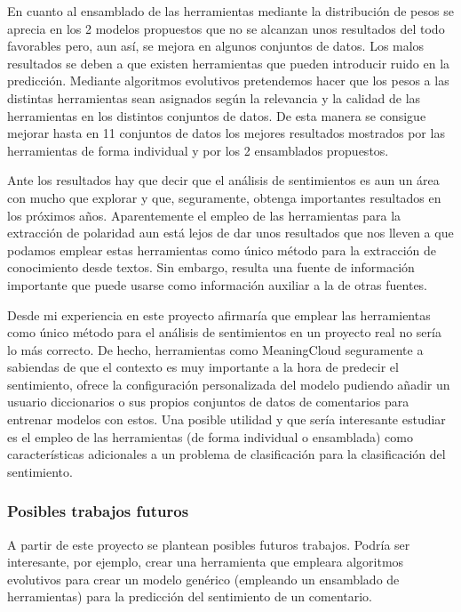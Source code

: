 En cuanto al ensamblado de las herramientas mediante la distribución de pesos se aprecia en los 2 modelos propuestos que no se alcanzan unos resultados del todo favorables pero, aun así, se mejora en algunos conjuntos de datos. Los malos resultados se deben a que existen herramientas que pueden introducir ruido en la predicción. Mediante algoritmos evolutivos pretendemos hacer que los pesos a las distintas herramientas sean asignados según la relevancia y la calidad de las herramientas en los distintos conjuntos de datos. De esta manera se consigue mejorar hasta en 11 conjuntos de datos los mejores resultados mostrados por las herramientas de forma individual y por los 2 ensamblados propuestos.

Ante los resultados hay que decir que el análisis de sentimientos es aun un área con mucho que explorar y que, seguramente, obtenga importantes resultados en los próximos años. Aparentemente el empleo de las herramientas para la extracción de polaridad aun está lejos de dar unos resultados que nos lleven a que podamos emplear estas herramientas como único método para la extracción de conocimiento desde textos. Sin embargo, resulta una fuente de información importante que puede usarse como información auxiliar a la de otras fuentes.

Desde mi experiencia en este proyecto afirmaría que emplear las herramientas como único método para el análisis de sentimientos en un proyecto real no sería lo más correcto. De hecho, herramientas como MeaningCloud seguramente a sabiendas de que el contexto es muy importante a la hora de predecir el sentimiento, ofrece la configuración personalizada del modelo pudiendo añadir un usuario diccionarios o sus propios conjuntos de datos de comentarios para entrenar modelos con estos. Una posible utilidad y que sería interesante estudiar es el empleo de las herramientas (de forma individual o ensamblada) como características adicionales a un problema de clasificación para la clasificación del sentimiento.

\subsubsection{Posibles trabajos futuros}
A partir de este proyecto se plantean posibles futuros trabajos. Podría ser interesante, por ejemplo, crear una herramienta que empleara algoritmos evolutivos para crear un modelo genérico (empleando un ensamblado de herramientas) para la predicción del sentimiento de un comentario.


